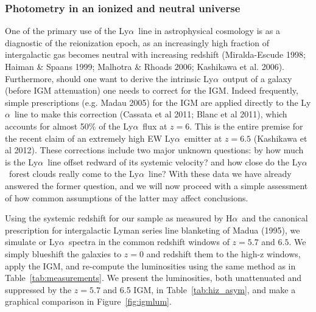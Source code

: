 \documentclass[manuscript]{emulateapj}
\newcommand{\lya}{Ly$\alpha$}
\newcommand{\ha}{H$\alpha$}
\begin{document}
\subsubsection{Photometry in an ionized and neutral universe}

One of the primary use of the \lya\ line in astrophysical cosmology is as a 
diagnostic of the reionization epoch, as an increasingly high fraction of 
intergalactic gas becomes neutral with increasing redshift 
(Miralda-Escude 1998; Haiman \& Spaans 1999; Malhotra \& Rhoads 2006; 
Kashikawa et al. 2006). Furthermore, should one want to derive the 
intrinsic \lya\ output of a galaxy (before IGM attenuation) one needs to
correct for the IGM. Indeed frequently, simple prescriptions (e.g. Madau 2005) 
for the IGM are applied directly to the \lya\ line to make this correction 
(Cassata et al 2011; Blanc et al 2011), which accounts for almost 50\% of the 
\lya\ flux at $z=6$. This is the entire premise for the recent claim of an 
extremely high EW \lya\ emitter at $z=6.5$ (Kashikawa et al 2012). 
These corrections include two major unknown questions: 
by how much is the \lya\ line offset redward of its systemic velocity? and 
how close do the \lya\ forest clouds really come to the \lya\ line? With these
data we have already answered the former question, and we will now proceed with
a simple assessment of how common assumptions of the latter may affect 
conclusions. 

Using the systemic redshift for our sample as measured by \ha\ and the 
canonical prescription for intergalactic Lyman series line blanketing 
of Madua (1995), we simulate or \lya\ spectra in the common redshift windows 
of $z=5.7$ and $6.5$. We simply blueshift the galaxies to $z=0$ and redshift
them to the high-z windows, apply the IGM, and re-compute the luminosities 
using the same method as in Table~\ref{tab:measurements}. We present the 
luminosities, both unattenuated and suppressed by the $z=5.7$ and 6.5 IGM, 
in Table~\ref{tab:hiz_asym}, and make a graphical comparison in 
Figure~\ref{fig:igmlum}. 
\end{document}
